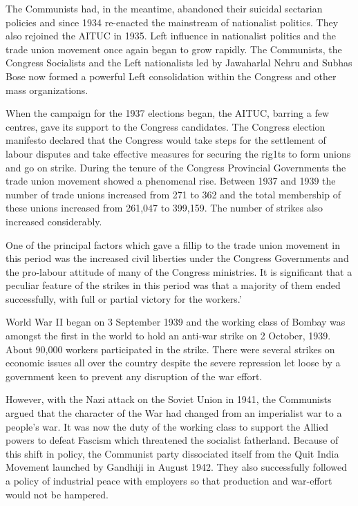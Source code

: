The Communists had, in the meantime, abandoned their suicidal sectarian policies and since 1934 re-enacted the mainstream of nationalist politics. They also rejoined the AITUC in 1935. Left influence in nationalist politics and the trade union movement once again began to grow rapidly. The Communists, the Congress Socialists and the Left nationalists led by Jawaharlal Nehru and Subhas Bose now formed a powerful Left consolidation within the Congress and other mass organizations.

When the campaign for the 1937 elections began, the AITUC, barring a few centres, gave its support to the Congress candidates. The Congress election manifesto declared that the Congress would take steps for the settlement of labour disputes and take effective measures for securing the rig1ts to form unions and go on strike. During the tenure of the Congress Provincial Governments the trade union movement showed a phenomenal rise. Between 1937 and 1939 the number of trade unions increased from 271 to 362 and the total membership of these unions increased from 261,047 to 399,159. The number of strikes also increased considerably.

One of the principal factors which gave a fillip to the trade union movement in this period was the increased civil liberties under the Congress Governments and the pro-labour attitude of many of the Congress ministries. It is significant that a peculiar feature of the strikes in this period was that a majority of them ended successfully, with full or partial victory for the workers.'

World War II began on 3 September 1939 and the working class of Bombay was amongst the first in the world to hold an anti-war strike on 2 October, 1939. About 90,000 workers participated in the strike. There were several strikes on economic issues all over the country despite the severe repression let loose by a government keen to prevent any disruption of the war effort.

However, with the Nazi attack on the Soviet Union in 1941, the Communists argued that the character of the War had changed from an imperialist war to a people's war. It was now the duty of the working class to support the Allied powers to defeat Fascism which threatened the socialist fatherland. Because of this shift in policy, the Communist party dissociated itself from the Quit India Movement launched by Gandhiji in August 1942. They also successfully followed a policy of industrial peace with employers so that production and war-effort would not be hampered.

